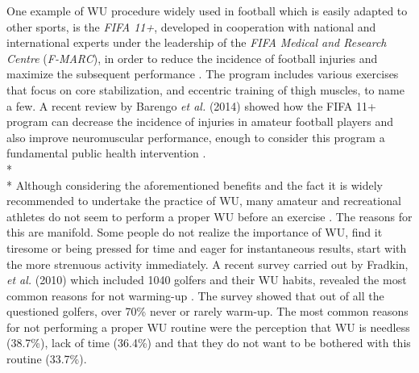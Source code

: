 One example of WU procedure widely used in football which is easily adapted to other sports, is the \textit{FIFA 11+}, developed in cooperation with national and international experts under the leadership of the \textit{FIFA Medical and Research Centre }(\textit{F-MARC}), in order to reduce the incidence of football injuries and maximize the subsequent performance \cite{fifa}. The program includes various exercises that focus on core stabilization, and eccentric training of thigh muscles, to name a few. A recent review by Barengo \textit{et al.} (2014) showed how the FIFA 11+ program can decrease the incidence of injuries in amateur football players and also improve neuromuscular performance, enough to consider this program a fundamental public health intervention \cite{barengo2014impact}.\\*\\*
Although considering the aforementioned benefits and the fact it is widely recommended to undertake the practice of WU, many amateur and recreational athletes do not seem to perform a proper WU before an exercise \cite{fradkin2010effects}. The reasons for this are manifold. Some people do not realize the importance of WU, find it tiresome or being pressed for time and eager for instantaneous results, start with the more strenuous activity immediately. A recent survey carried out by Fradkin, \textit{et al.} (2010)  which included 1040 golfers and their WU habits, revealed the most common reasons for not warming-up \cite{fradkin2010effects}. The survey showed that out of all the questioned golfers, over 70\% never or rarely warm-up. The most common reasons for not performing a proper WU routine were the perception that WU is needless (38.7\%), lack of time (36.4\%) and that they do not want to be bothered with this routine (33.7\%).
